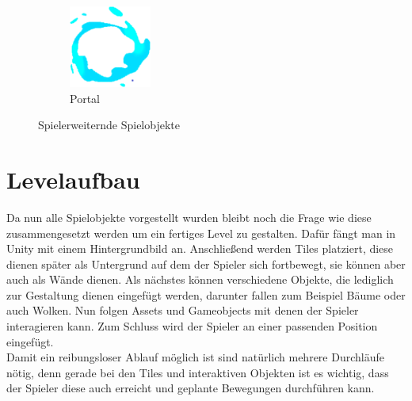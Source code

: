 \begin{figure}[H]
\begin{subfigure}[H]{0.15\textwidth}
        \includegraphics[width=\textwidth]{img/realisierung/assets/portal}
        \caption{Portal}
        \label{fig:portal}
    \end{subfigure}
    \caption{Spielerweiternde Spielobjekte}
    \label{fig:barriereandportal}
\end{figure}

\section{Levelaufbau}
\label{sec:implementierung:levelaufbau}
Da nun alle Spielobjekte vorgestellt wurden bleibt noch die Frage wie diese zusammengesetzt werden um ein fertiges Level zu gestalten. Dafür fängt man in Unity mit einem Hintergrundbild an. Anschließend werden Tiles platziert, diese dienen später als Untergrund auf dem der Spieler sich fortbewegt, sie können aber auch als Wände dienen. Als nächstes können verschiedene Objekte, die lediglich zur Gestaltung dienen eingefügt werden, darunter fallen zum Beispiel Bäume oder auch Wolken. Nun folgen Assets und Gameobjects mit denen der Spieler interagieren kann. Zum Schluss wird der Spieler an einer passenden Position eingefügt. \\
Damit ein reibungsloser Ablauf möglich ist sind natürlich mehrere Durchläufe nötig, denn gerade bei den Tiles und interaktiven Objekten ist es wichtig, dass der Spieler diese auch erreicht und geplante Bewegungen durchführen kann.

